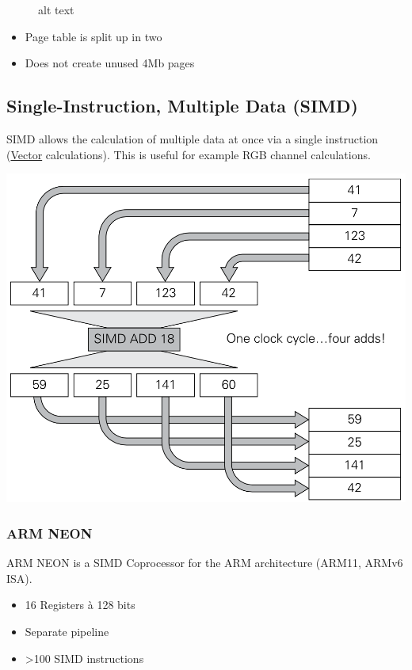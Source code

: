 \documentclass[
  10pt,
  a4paper,
]{article}
\providecommand{\tightlist}{%
  \setlength{\itemsep}{0pt}\setlength{\parskip}{0pt}}\usepackage{longtable,booktabs,array}
\begin{document}
\begin{multicols*}{2}
\begin{figure}[H]
{}

\caption{alt text}

\end{figure}%

{\small

\begin{itemize}
\tightlist
\item
  Page table is split up in two
\item
  Does not create unused 4Mb pages
\end{itemize}

}

\subsection{Single-Instruction, Multiple Data
(SIMD)}\label{single-instruction-multiple-data-simd}

SIMD allows the calculation of multiple data at once via a single
instruction (\ul{Vector} calculations). This is useful for example RGB
channel calculations.

\includegraphics{images/performance/image-24.png}

\subsubsection{ARM NEON}\label{arm-neon}

ARM NEON is a SIMD Coprocessor for the ARM architecture (ARM11, ARMv6
ISA).

\begin{itemize}
\tightlist
\item
  16 Registers à 128 bits
\item
  Separate pipeline
\item
  \textgreater100 SIMD instructions
\end{itemize}


\end{multicols*}
\end{document}

